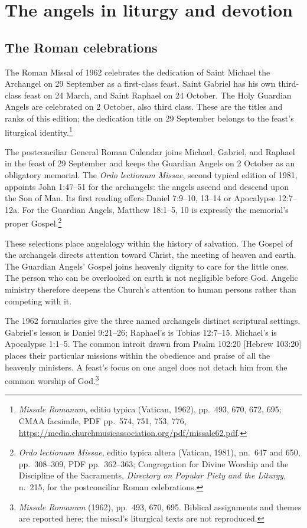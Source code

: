 \section{The angels in liturgy and devotion}

\subsection{The Roman celebrations}

The Roman Missal of 1962 celebrates the dedication of Saint Michael the
Archangel on 29 September as a first-class feast. Saint Gabriel has his own
third-class feast on 24 March, and Saint Raphael on 24 October. The Holy
Guardian Angels are celebrated on 2 October, also third class. These are the
titles and ranks of this edition; the dedication title on 29 September
belongs to the feast's liturgical identity.\footnote{\emph{Missale Romanum},
editio typica (Vatican, 1962), pp.~493, 670, 672, 695; CMAA facsimile,
PDF pp.~574, 751, 753, 776,
\url{https://media.churchmusicassociation.org/pdf/missale62.pdf}.}

The postconciliar General Roman Calendar joins Michael, Gabriel, and Raphael
in the feast of 29 September and keeps the Guardian Angels on 2 October as
an obligatory memorial. The \emph{Ordo lectionum Missae}, second typical
edition of 1981, appoints John 1:47--51 for the archangels: the angels ascend
and descend upon the Son of Man. Its first reading offers Daniel 7:9--10,
13--14 or Apocalypse 12:7--12a. For the Guardian Angels, Matthew 18:1--5, 10
is expressly the memorial's proper Gospel.\footnote{\emph{Ordo lectionum
Missae}, editio typica altera (Vatican, 1981), nn.~647 and 650, pp.~308--309,
PDF pp.~362--363; Congregation for Divine Worship and the Discipline of the
Sacraments, \emph{Directory on Popular Piety and the Liturgy}, n.~215,
for the postconciliar Roman celebrations.}

These selections place angelology within the history of salvation. The
Gospel of the archangels directs attention toward Christ, the meeting of
heaven and earth. The Guardian Angels' Gospel joins heavenly dignity to
care for the little ones. The person who can be overlooked on earth is
not negligible before God. Angelic ministry therefore deepens the Church's
attention to human persons rather than competing with it.

The 1962 formularies give the three named archangels distinct scriptural
settings. Gabriel's lesson is Daniel 9:21--26; Raphael's is Tobias
12:7--15. Michael's is Apocalypse 1:1--5. The common introit drawn from
Psalm 102:20 [Hebrew 103:20] places their particular missions within the
obedience and praise of all the heavenly ministers. A feast's focus on one
angel does not detach him from the common worship of God.\footnote{\emph{Missale
Romanum} (1962), pp.~493, 670, 695. Biblical assignments and themes are
reported here; the missal's liturgical texts are not reproduced.}

